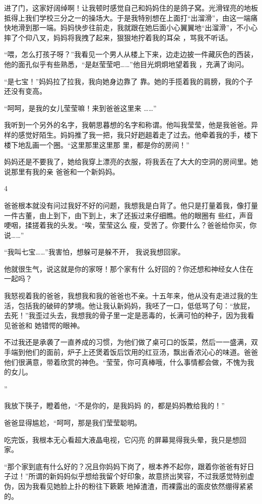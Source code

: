 \documentclass{article}
\begin{document}
进了门，这家好阔绰啊！让我顿时感觉自己和妈妈住的是鸽子窝。光滑锃亮的地板抵得上我们学校三分之一的操场大。于是我特别想在上面打“出溜滑”，由这一端痛快地滑到那一端。妈妈快步往前走，我就跟在她后面小心翼翼地“出溜滑”，不小心摔了个仰八叉，妈妈将我拽了起来，狠狠地拧着我的耳朵
，骂我不听话。 

“喂，怎么打孩子呀？”我看见一个男人从楼上下来，边走边披一件藏灰色的西装，他的面孔似乎有些熟悉，“是赵莹莹吧……”他目光炯炯地望着我
，充满了询问。 

\newpage

“是七宝！”妈妈拉了拉我，我向她身边靠了
靠。她的手揽着我的肩膀，我的个子还没有变高。 

“呵呵，是我的女儿莹莹嘛！来到爸爸这里来
……” 

我听到一个另外的名字，我朝思暮想的名字和称谓。他叫我莹莹，他是我爸爸。异样的感觉好陌生。妈妈推了我一把，我只好趔趄着走了过去。他牵着我的手，楼下楼下地乱画一个圈。“这里那里这里那
里，都是你的房间！” 

妈妈还是不要我了，她给我穿上漂亮的衣服，将我丢在了大大的空洞的房间里。她说那里有我的亲
爸爸和一个新妈妈。 


4 

爸爸根本就没有问过我好不好的问题，我想我是白背了。他只是打量着我，像打量一件古董，由上到下，由下到上，末了还扳过来仔细瞧。他的眼圈有
\newpage
些红，声音哽咽，揉搓着我的头发。“唉，莹莹这么
瘦，受苦了。你要什么？爸爸给你买，你说……” 

“我叫七宝……”我害怕，想躲可是躲不开，
我说我想回家。 

他就很生气，说这就是你的家呀！那个家有什
么好回的？你还想和神经女人住在一起吗？ 

我怒视着我的爸爸，我想我和我的爸爸也不亲。十五年来，他从没有走进过我的生活，包括我的破碎的梦境。他让我认新妈妈，我呸了一口，低低骂了句：“放屁，去死！”我歪过头去，我想我的骨子里一定是恶毒的，长满可怕的种子，因为我看见爸爸和
她错愕的眼神。 

不过我还是承袭了一直养成的习惯，为他们做了桌可口的饭菜，然后一一盛满，双手端到他们的面前，炉子上还煲着饭后饮用的红豆汤，飘出香浓沁心的味道。爸爸他们很满意，带着欣赏的神色。“莹莹，你可真棒哦，什么事情都会做，不愧为我的女儿。
\newpage

” 

我放下筷子，瞪着他，“不是你的，是我妈妈
的，都是妈妈教给我的！” 

爸爸显得尴尬，“呵呵，那是我们莹莹聪明。

吃完饭，我根本无心看超大液晶电视，它闪亮
的屏幕晃得我头晕，我只是想回家。 

“那个家到底有什么好的？况且你妈妈下岗了，根本养不起你，跟着你爸爸有好日子过！”所谓的新妈妈似乎想给我留个好印象，故意挤出笑容，不过我感觉特别虚伪，因为我看见她脸上扑的粉往下簌簌
地掉渣渣，而裸露出的面皮依然绷得紧紧的。 
\end{document}
